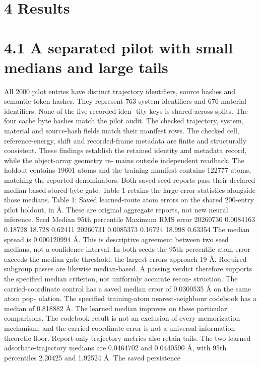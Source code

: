 \documentclass[11pt]{article}
\begin{document}
\section*{4 Results}


\section*{4.1 A separated pilot with small medians and large tails}

All 2000 pilot entries have distinct trajectory identifiers, source hashes and semantic-token hashes.
They represent 763 system identifiers and 676 material identifiers. None of the five recorded iden-
tity keys is shared across splits. The four cache byte hashes match the pilot audit. The checked
trajectory, system, material and source-hash fields match their manifest rows. The checked cell,
reference-energy, shift and recorded-frame metadata are finite and structurally consistent. These
findings establish the retained identity and metadata record, while the object-array geometry re-
mains outside independent readback.
The holdout contains 19601 atoms and the training manifest contains 122777 atoms, matching
the reported denominators. Both saved seed reports pass their declared median-based stored-byte
gate. Table 1 retains the large-error statistics alongside those medians.
Table 1: Saved learned-route atom errors on the shared 200-entry pilot holdout, in Å. These are
original aggregate reports, not new neural inference.
Seed Median 95th percentile Maximum RMS error
20260730 0.0084163 0.18728 18.728 0.62411
20260731 0.0085373 0.16724 18.998 0.63354
The median spread is 0.000120994 Å. This is descriptive agreement between two seed medians,
not a confidence interval. In both seeds the 95th-percentile atom error exceeds the median gate
threshold; the largest errors approach 19 Å. Required subgroup passes are likewise median-based.
A passing verdict therefore supports the specified median criterion, not uniformly accurate recon-
struction.
The carried-coordinate control has a saved median error of 0.0300535 Å on the same atom pop-
ulation. The specified training-atom nearest-neighbour codebook has a median of 0.818882 Å. The
learned median improves on these particular comparisons. The codebook result is not an exclusion
of every memorization mechanism, and the carried-coordinate error is not a universal information-
theoretic floor.
Report-only trajectory metrics also retain tails. The two learned adsorbate-trajectory medians
are 0.0464702 and 0.0440590 Å, with 95th percentiles 2.20425 and 1.92524 Å. The saved persistence
\end{document}
